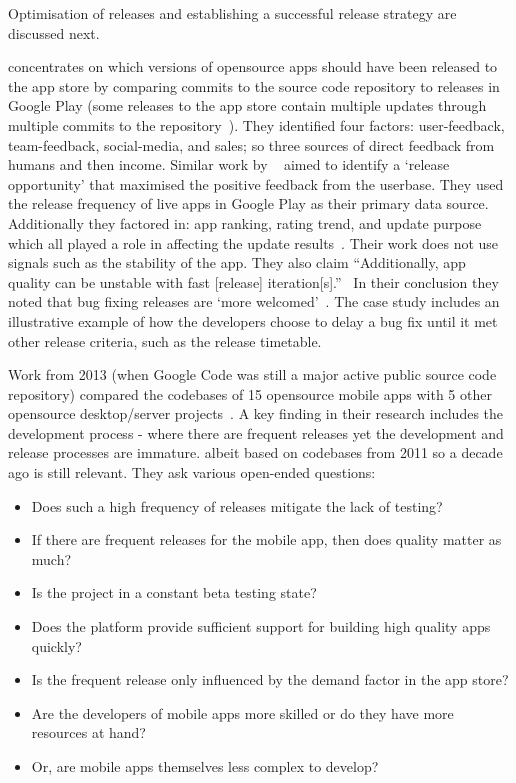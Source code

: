 Optimisation of releases and establishing a successful release strategy are discussed next. 

 concentrates on which versions of opensource apps should have been released to the app store by comparing commits to the source code repository to releases in Google Play (some releases to the app store contain multiple updates through multiple commits to the repository~). They identified four factors: user-feedback, team-feedback, social-media, and sales; so three sources of direct feedback from humans and then income. Similar work by ~ aimed to identify a `release opportunity' that maximised the positive feedback from the userbase. They used the release frequency of live apps in Google Play as their primary data source. Additionally they factored in: app ranking, rating trend, and update purpose which all played a role in affecting the update results~. Their work does not use signals such as the stability of the app. They also claim ``Additionally, app quality can be unstable with fast [release] iteration[s].''~ In their conclusion they noted that bug fixing releases are `more welcomed'~. The  case study includes an illustrative example of how the developers choose to delay a bug fix until it met other release criteria, such as the release timetable. %

Work from 2013 (when Google Code was still a major active public source code repository) compared the codebases of 15 opensource mobile apps with 5 other opensource desktop/server projects~. A key finding in their research includes the development process - where there are frequent releases yet the development and release processes are immature. albeit based on codebases from 2011 so a decade ago is still relevant. They ask various open-ended questions:
    \begin{itemize}
        \item Does such a high frequency of releases mitigate the lack of testing? 
        \item If there are frequent releases for the mobile app, then does quality matter as much?
        \item Is the project in a constant beta testing state? 
        \item Does the platform provide sufficient support for building high quality apps quickly? 
        \item Is the frequent release only influenced by the demand factor in the app store? 
        \item Are the developers of mobile apps more skilled or do they have more resources at hand? 
        \item Or, are mobile apps themselves less complex to develop?
    \end{itemize}
    
